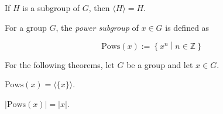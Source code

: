 \begin{theorem}
    \label{theorem : Generate_self_eq_self}
    \leanok
    If $H$ is a subgroup of $G$, then $\langle H \rangle = H$.
\end{theorem}

\begin{definition}
    \label{definition : Pows}
    \leanok
    For a group $G$, the \textit{power subgroup} of $x \in G$ is defined as

    $$\text{Pows}(x) := \left\{ x^n \middle| n \in \mathbb{Z} \right\}$$
\end{definition}

For the following theorems, let $G$ be a group and let $x \in G$.

\begin{theorem}
    \label{theorem : Pows_eq_Generate_singleton}
    \leanok
    $\text{Pows}(x) = \langle \{x\} \rangle$.
\end{theorem}

\begin{theorem}
    \label{theorem : Pows_card_eq_order}
    \leanok
    $|\text{Pows}(x)| = |x|$.
\end{theorem}
